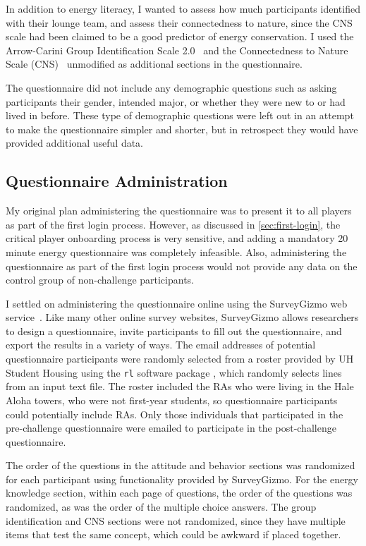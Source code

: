 In addition to energy literacy, I wanted to assess how much participants identified with their lounge team, and assess their connectedness to nature, since the CNS scale had been claimed to be a good predictor of energy conservation. I used the Arrow-Carini Group Identification Scale 2.0~\cite{Henry1999} and the Connectedness to Nature Scale (CNS)~\cite{MayerFrantz2004} unmodified as additional sections in the questionnaire.

The questionnaire did not include any demographic questions such as asking participants their gender, intended major, or whether they were new to \Hawaii or had lived in \Hawaii before. These type of demographic questions were left out in an attempt to make the questionnaire simpler and shorter, but in retrospect they would have provided additional useful data.


\subsection{Questionnaire Administration}

My original plan administering the questionnaire was to present it to all players as part of the first login process. However, as discussed in \autoref{sec:first-login}, the critical player onboarding process is very sensitive, and adding a mandatory 20 minute energy questionnaire was completely infeasible. Also, administering the questionnaire as part of the first login process would not provide any data on the control group of non-challenge participants.

I settled on administering the questionnaire online using the SurveyGizmo web service~\cite{surveygizmo}. Like many other online survey websites, SurveyGizmo allows researchers to design a questionnaire, invite participants to fill out the questionnaire, and export the results in a variety of ways. The email addresses of potential questionnaire participants were randomly selected from a roster provided by UH \Manoa Student Housing using the \texttt{rl} software package \cite{rl-website}, which randomly selects lines from an input text file. The roster included the RAs who were living in the Hale Aloha towers, who were not first-year students, so questionnaire participants could potentially include RAs. Only those individuals that participated in the pre-challenge questionnaire were emailed to participate in the post-challenge questionnaire. 

The order of the questions in the attitude and behavior sections was randomized for each participant using functionality provided by SurveyGizmo. For the energy knowledge section, within each page of questions, the order of the questions was randomized, as was the order of the multiple choice answers. The group identification and CNS sections were not randomized, since they have multiple items that test the same concept, which could be awkward if placed together.

